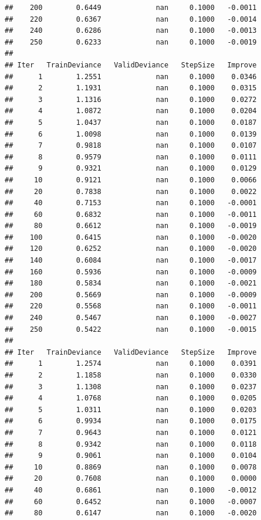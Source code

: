 \documentclass[
]{book}
\begin{document}
\begin{verbatim}
##    200        0.6449             nan     0.1000   -0.0011
##    220        0.6367             nan     0.1000   -0.0014
##    240        0.6286             nan     0.1000   -0.0013
##    250        0.6233             nan     0.1000   -0.0019
## 
## Iter   TrainDeviance   ValidDeviance   StepSize   Improve
##      1        1.2551             nan     0.1000    0.0346
##      2        1.1931             nan     0.1000    0.0315
##      3        1.1316             nan     0.1000    0.0272
##      4        1.0872             nan     0.1000    0.0204
##      5        1.0437             nan     0.1000    0.0187
##      6        1.0098             nan     0.1000    0.0139
##      7        0.9818             nan     0.1000    0.0107
##      8        0.9579             nan     0.1000    0.0111
##      9        0.9321             nan     0.1000    0.0129
##     10        0.9121             nan     0.1000    0.0066
##     20        0.7838             nan     0.1000    0.0022
##     40        0.7153             nan     0.1000   -0.0001
##     60        0.6832             nan     0.1000   -0.0011
##     80        0.6612             nan     0.1000   -0.0019
##    100        0.6415             nan     0.1000   -0.0020
##    120        0.6252             nan     0.1000   -0.0020
##    140        0.6084             nan     0.1000   -0.0017
##    160        0.5936             nan     0.1000   -0.0009
##    180        0.5834             nan     0.1000   -0.0021
##    200        0.5669             nan     0.1000   -0.0009
##    220        0.5568             nan     0.1000   -0.0011
##    240        0.5467             nan     0.1000   -0.0027
##    250        0.5422             nan     0.1000   -0.0015
## 
## Iter   TrainDeviance   ValidDeviance   StepSize   Improve
##      1        1.2574             nan     0.1000    0.0391
##      2        1.1858             nan     0.1000    0.0330
##      3        1.1308             nan     0.1000    0.0237
##      4        1.0768             nan     0.1000    0.0205
##      5        1.0311             nan     0.1000    0.0203
##      6        0.9934             nan     0.1000    0.0175
##      7        0.9643             nan     0.1000    0.0121
##      8        0.9342             nan     0.1000    0.0118
##      9        0.9061             nan     0.1000    0.0104
##     10        0.8869             nan     0.1000    0.0078
##     20        0.7608             nan     0.1000    0.0000
##     40        0.6861             nan     0.1000   -0.0012
##     60        0.6452             nan     0.1000   -0.0007
##     80        0.6147             nan     0.1000   -0.0020

\end{verbatim}
\end{document}
